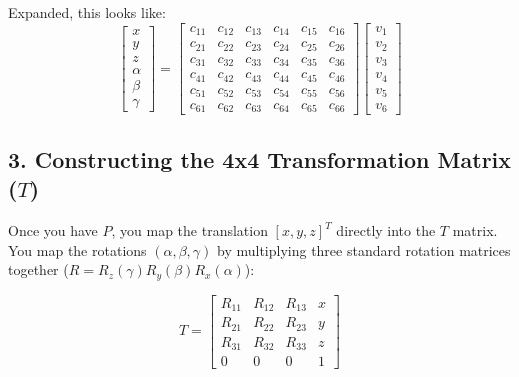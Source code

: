 \documentclass{article}
\begin{document}
Expanded, this looks like:
\begin{equation}
\begin{bmatrix} x \\ y \\ z \\ \alpha \\ \beta \\ \gamma \end{bmatrix} = \begin{bmatrix} 
c_{11} & c_{12} & c_{13} & c_{14} & c_{15} & c_{16} \\ 
c_{21} & c_{22} & c_{23} & c_{24} & c_{25} & c_{26} \\ 
c_{31} & c_{32} & c_{33} & c_{34} & c_{35} & c_{36} \\ 
c_{41} & c_{42} & c_{43} & c_{44} & c_{45} & c_{46} \\ 
c_{51} & c_{52} & c_{53} & c_{54} & c_{55} & c_{56} \\ 
c_{61} & c_{62} & c_{63} & c_{64} & c_{65} & c_{66} 
\end{bmatrix} \begin{bmatrix} v_1 \\ v_2 \\ v_3 \\ v_4 \\ v_5 \\ v_6 \end{bmatrix}
\end{equation}

\subsection*{3. Constructing the 4x4 Transformation Matrix ($T$)}
Once you have $P$, you map the translation $[x, y, z]^T$ directly into the $T$ matrix. You map the rotations $(\alpha, \beta, \gamma)$ by multiplying three standard rotation matrices together ($R = R_z(\gamma) R_y(\beta) R_x(\alpha)$):

\begin{equation}
T = \begin{bmatrix} 
R_{11} & R_{12} & R_{13} & x \\ 
R_{21} & R_{22} & R_{23} & y \\ 
R_{31} & R_{32} & R_{33} & z \\ 
0 & 0 & 0 & 1 
\end{bmatrix}
\end{equation}
\end{document}
